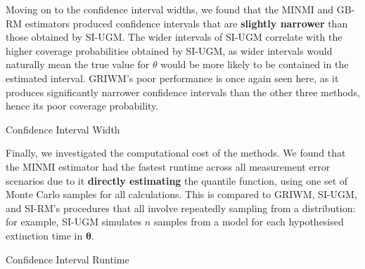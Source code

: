 Moving on to the confidence interval widths, we found that the MINMI and GB-RM estimators produced confidence intervals that are \textbf{slightly narrower} than those obtained by SI-UGM. The wider intervals of SI-UGM  correlate with the higher coverage probabilities obtained by SI-UGM, as wider intervals would naturally mean the true value for $\theta$ would be more likely to be contained in the  estimated interval. GRIWM's poor performance is once again seen here, as it produces significantly narrower confidence intervals than the other three methods, hence its poor coverage probability.
\begin{table}[ht]
    \centering
    \caption{Confidence Interval Width}
    
    \label{tab:table-sim-exp-width}
\end{table}

Finally, we investigated the computational cost of the methods. We found that the MINMI estimator had the fastest runtime across all measurement error scenarios due to it \textbf{directly estimating} the quantile function, using one set of Monte Carlo samples for all calculations. This is compared to GRIWM, SI-UGM, and SI-RM's procedures that all involve repeatedly sampling from a distribution: for example, SI-UGM simulates $n$ samples from a model for each hypothesised extinction time in $\bm{\theta}$.
\begin{table}[ht]
    \centering
    \caption{Confidence Interval Runtime}
    
    \label{tab:table-sim-exp-runtime}
\end{table}

